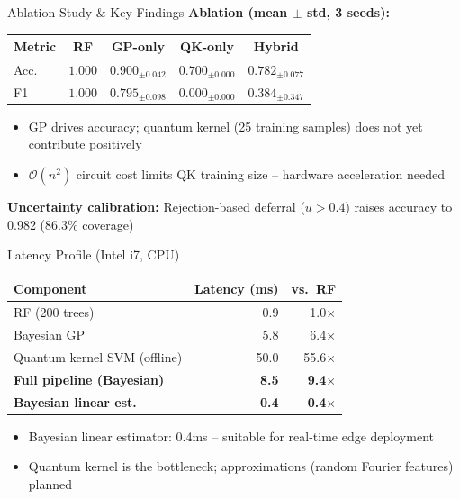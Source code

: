 \documentclass[10pt,aspectratio=169]{beamer}
\begin{document}
\begin{frame}{Ablation Study \& Key Findings}
  \textbf{Ablation (mean $\pm$ std, 3 seeds):}
  \begin{table}
    \footnotesize
    \begin{tabular}{lcccc}
      \toprule
      \textbf{Metric} & \textbf{RF} & \textbf{GP-only} & \textbf{QK-only} & \textbf{Hybrid} \\
      \midrule
      Acc.  & $\mathbf{1.000}$ & $0.900_{\pm 0.042}$ & $0.700_{\pm 0.000}$ & $0.782_{\pm 0.077}$ \\
      F1    & $\mathbf{1.000}$ & $0.795_{\pm 0.098}$ & $0.000_{\pm 0.000}$ & $0.384_{\pm 0.347}$ \\
      \bottomrule
    \end{tabular}
  \end{table}
  \begin{itemize}
    \item GP drives accuracy; quantum kernel (25 training samples) does not yet contribute positively
    \item $\mathcal{O}(n^2)$ circuit cost limits QK training size -- hardware acceleration needed
  \end{itemize}
  \vfill
  \textbf{Uncertainty calibration:} Rejection-based deferral ($u > 0.4$) raises accuracy to 0.982 (86.3\% coverage)
\end{frame}

\begin{frame}{Latency Profile (Intel i7, CPU)}
  \begin{table}
    \centering
    \footnotesize
    \begin{tabular}{lrr}
      \toprule
      \textbf{Component} & \textbf{Latency (ms)} & \textbf{vs.\ RF} \\
      \midrule
      RF (200 trees) & 0.9 & 1.0$\times$ \\
      Bayesian GP & 5.8 & 6.4$\times$ \\
      Quantum kernel SVM (offline) & 50.0 & 55.6$\times$ \\
      \textbf{Full pipeline (Bayesian)} & \textbf{8.5} & \textbf{9.4$\times$} \\
      \textbf{Bayesian linear est.} & \textbf{0.4} & \textbf{0.4$\times$} \\
      \bottomrule
    \end{tabular}
  \end{table}
  \begin{itemize}
    \item Bayesian linear estimator: 0.4ms -- suitable for real-time edge deployment
    \item Quantum kernel is the bottleneck; approximations (random Fourier features) planned
  \end{itemize}
\end{frame}
\end{document}
